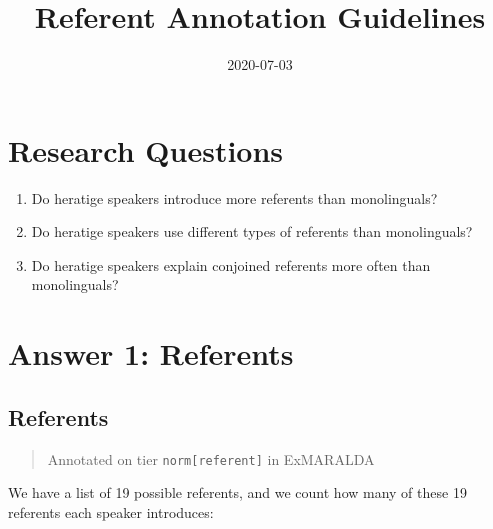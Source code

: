 \documentclass[
]{book}
\title{Referent Annotation Guidelines}
\author{}
\date{\vspace{-2.5em}2020-07-03}
\begin{document}
\maketitle

{
\setcounter{tocdepth}{1}
\tableofcontents
}
\hypertarget{research-questions}{%
\chapter{Research Questions}\label{research-questions}}

\begin{enumerate}
\def\labelenumi{\arabic{enumi}.}
\item
  Do heratige speakers introduce more referents than monolinguals?
\item
  Do heratige speakers use different types of referents than monolinguals?
\item
  Do heratige speakers explain conjoined referents more often than monolinguals?
\end{enumerate}

\hypertarget{answer-1-referents}{%
\chapter{Answer 1: Referents}\label{answer-1-referents}}

\hypertarget{referents}{%
\section{Referents}\label{referents}}

\begin{quote}
Annotated on tier \texttt{norm{[}referent{]}} in ExMARALDA
\end{quote}

We have a list of 19 possible referents, and we count how many of these 19 referents each speaker introduces:
\end{document}
